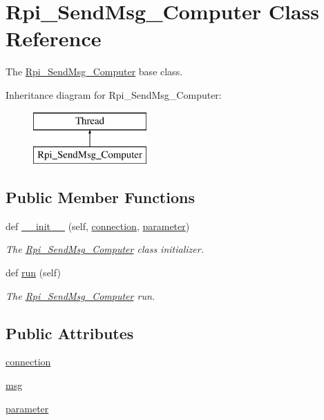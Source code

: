 \hypertarget{a00045}{}\section{Rpi\+\_\+\+Send\+Msg\+\_\+\+Computer Class Reference}
\label{a00045}


The \hyperlink{a00045}{Rpi\+\_\+\+Send\+Msg\+\_\+\+Computer} base class.  


Inheritance diagram for Rpi\+\_\+\+Send\+Msg\+\_\+\+Computer\+:\begin{figure}[H]
\begin{center}
\leavevmode
\includegraphics[height=2.000000cm]{a00045}
\end{center}
\end{figure}
\subsection*{Public Member Functions}
\begin{DoxyCompactItemize}
\item 
def \hyperlink{a00045_ab31bcaed710c978236824fea1cc5c9f4}{\+\_\+\+\_\+init\+\_\+\+\_\+} (self, \hyperlink{a00045_a10275a078bd1abcbebc206cc5d19e18b}{connection}, \hyperlink{a00045_a0d71b5c1dcca8d3fee88d6a11d3e2071}{parameter})
\begin{DoxyCompactList}\small\item\em The \hyperlink{a00045}{Rpi\+\_\+\+Send\+Msg\+\_\+\+Computer} class initializer. \end{DoxyCompactList}\item 
def \hyperlink{a00045_ad22709b2e67308af35f55680d5a026e0}{run} (self)
\begin{DoxyCompactList}\small\item\em The \hyperlink{a00045}{Rpi\+\_\+\+Send\+Msg\+\_\+\+Computer} run. \end{DoxyCompactList}\end{DoxyCompactItemize}
\subsection*{Public Attributes}
\begin{DoxyCompactItemize}
\item 
\hyperlink{a00045_a10275a078bd1abcbebc206cc5d19e18b}{connection}
\item 
\hyperlink{a00045_a10a0f35066079abd150539d0d13dbf3e}{msg}
\item 
\hyperlink{a00045_a0d71b5c1dcca8d3fee88d6a11d3e2071}{parameter}
\end{DoxyCompactItemize}


